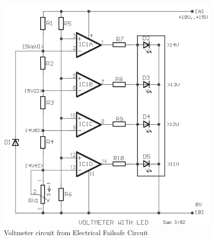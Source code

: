 \documentclass[main.tex]{subfiles}
\begin{document}
    \begin{figure}[H]
        \centering
        \includegraphics[scale = 0.5]{images/Voltmeter}
        \caption{Voltmeter circuit from Electrical Failsafe Circuit}
        \label{Voltmeter}
    \end{figure}
\end{document}
